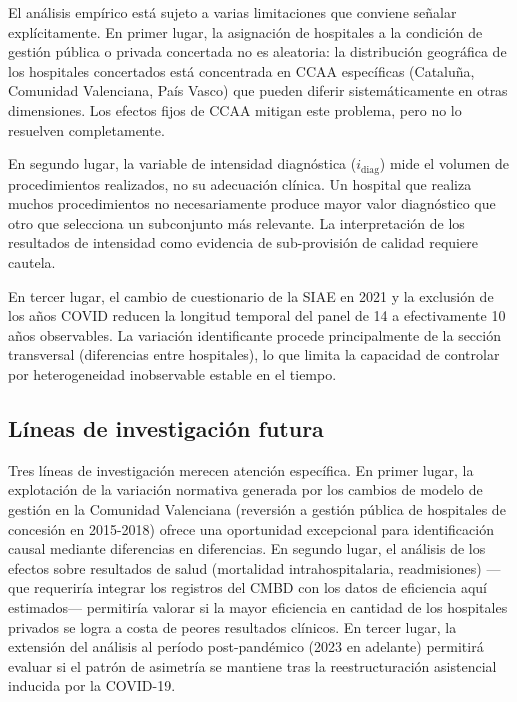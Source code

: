 El análisis empírico está sujeto a varias limitaciones que conviene señalar explícitamente. En primer lugar, la asignación de hospitales a la condición de gestión pública o privada concertada no es aleatoria: la distribución geográfica de los hospitales concertados está concentrada en CCAA específicas (Cataluña, Comunidad Valenciana, País Vasco) que pueden diferir sistemáticamente en otras dimensiones. Los efectos fijos de CCAA mitigan este problema, pero no lo resuelven completamente.

En segundo lugar, la variable de intensidad diagnóstica ($i_{\text{diag}}$) mide el volumen de procedimientos realizados, no su adecuación clínica. Un hospital que realiza muchos procedimientos no necesariamente produce mayor valor diagnóstico que otro que selecciona un subconjunto más relevante. La interpretación de los resultados de intensidad como evidencia de sub-provisión de calidad requiere cautela.

En tercer lugar, el cambio de cuestionario de la SIAE en 2021 y la exclusión de los años COVID reducen la longitud temporal del panel de 14 a efectivamente 10 años observables. La variación identificante procede principalmente de la sección transversal (diferencias entre hospitales), lo que limita la capacidad de controlar por heterogeneidad inobservable estable en el tiempo.

\subsection{Líneas de investigación futura}
\label{subsec:futuro}

Tres líneas de investigación merecen atención específica. En primer lugar, la explotación de la variación normativa generada por los cambios de modelo de gestión en la Comunidad Valenciana (reversión a gestión pública de hospitales de concesión en 2015-2018) ofrece una oportunidad excepcional para identificación causal mediante diferencias en diferencias. En segundo lugar, el análisis de los efectos sobre resultados de salud (mortalidad intrahospitalaria, readmisiones) —que requeriría integrar los registros del CMBD con los datos de eficiencia aquí estimados— permitiría valorar si la mayor eficiencia en cantidad de los hospitales privados se logra a costa de peores resultados clínicos. En tercer lugar, la extensión del análisis al período post-pandémico (2023 en adelante) permitirá evaluar si el patrón de asimetría se mantiene tras la reestructuración asistencial inducida por la COVID-19.
